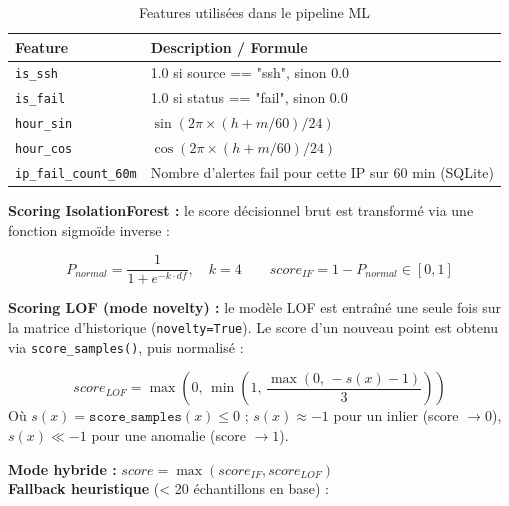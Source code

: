 \documentclass[12pt,a4paper]{report}
\begin{document}
\begin{table}[H]
\centering
\caption{Features utilisées dans le pipeline ML}
\label{tab:ml_features}
\begin{tabular}{|p{4.5cm}|p{9cm}|}
\hline
\textbf{Feature} & \textbf{Description / Formule} \\
\hline
\texttt{is\_ssh} & 1.0 si source == "ssh", sinon 0.0 \\
\hline
\texttt{is\_fail} & 1.0 si status == "fail", sinon 0.0 \\
\hline
\texttt{hour\_sin} & $\sin(2\pi \times (h + m/60) / 24)$ \\
\hline
\texttt{hour\_cos} & $\cos(2\pi \times (h + m/60) / 24)$ \\
\hline
\texttt{ip\_fail\_count\_60m} & Nombre d'alertes fail pour cette IP sur 60 min (SQLite) \\
\hline
\end{tabular}
\end{table}

\begin{onehalfspace}
\textbf{Scoring IsolationForest :} le score décisionnel brut est transformé
via une fonction sigmoïde inverse :
\end{onehalfspace}

\begin{tcolorbox}[colback=lightblue, colframe=darkblue, arc=5pt,
  title={\textbf{Formule IsolationForest}}]
\[
P_{normal} = \frac{1}{1 + e^{-k \cdot df}}, \quad k=4 \qquad
score_{IF} = 1 - P_{normal} \in [0, 1]
\]
\end{tcolorbox}

\begin{onehalfspace}
\textbf{Scoring LOF (mode novelty) :} le modèle LOF est entraîné une seule
fois sur la matrice d'historique (\texttt{novelty=True}). Le score d'un
nouveau point est obtenu via \texttt{score\_samples()}, puis normalisé :
\end{onehalfspace}

\begin{tcolorbox}[colback=lightblue, colframe=darkblue, arc=5pt,
  title={\textbf{Formule LOF — normalisation novelty}}]
\[
score_{LOF} = \max\!\left(0,\, \min\!\left(1,\, \frac{\max(0,\, -s(x) - 1)}{3}\right)\right)
\]
Où $s(x) = \texttt{score\_samples}(x) \leq 0$ ;
$s(x) \approx -1$ pour un inlier (score $\rightarrow 0$),
$s(x) \ll -1$ pour une anomalie (score $\rightarrow 1$).
\end{tcolorbox}

\begin{onehalfspace}
\textbf{Mode hybride :} $score = \max(score_{IF}, score_{LOF})$\\[6pt]
\textbf{Fallback heuristique} (< 20 échantillons en base) :
\end{onehalfspace}
\end{document}
